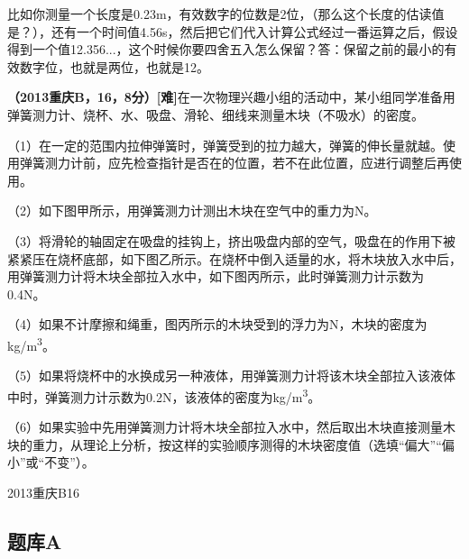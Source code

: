 \documentclass[12pt,twoside]{exam}
\begin{document}
\begin{knowledge}
比如你测量一个长度是0.23m，有效数字的位数是2位，（那么这个长度的估读值是？），还有一个时间值4.56s，然后把它们代入计算公式经过一番运算之后，假设得到一个值12.356...，这个时候你要四舍五入怎么保留？答：保留之前的最小的有效数字位，也就是两位，也就是12。

\textbf{（2013重庆B，16，8分）[难]}在一次物理兴趣小组的活动中，某小组同学准备用弹簧测力计、烧杯、水、吸盘、滑轮、细线来测量木块（不吸水）的密度。

（1）在一定的范围内拉伸弹簧时，弹簧受到的拉力越大，弹簧的伸长量就越\answerline*[大]。使用弹簧测力计前，应先检查指针是否在\answerline*[零刻度线]的位置，若不在此位置，应进行调整后再使用。

（2）如下图甲所示，用弹簧测力计测出木块在空气中的重力为\answerline*[0.6]N。

（3）将滑轮的轴固定在吸盘的挂钩上，挤出吸盘内部的空气，吸盘在\answerline*[大气压]的作用下被紧紧压在烧杯底部，如下图乙所示。在烧杯中倒入适量的水，将木块放入水中后，用弹簧测力计将木块全部拉入水中，如下图丙所示，此时弹簧测力计示数为0.4N。

（4）如果不计摩擦和绳重，图丙所示的木块受到的浮力为\answerline*[1]N，木块的密度为\answerline*[\num{0.6d3}] \si{kg/m^3}。

（5）如果将烧杯中的水换成另一种液体，用弹簧测力计将该木块全部拉入该液体中时，弹簧测力计示数为0.2N，该液体的密度为\answerline*[\num{0.8d3}] \si{kg/m^3}。

（6）如果实验中先用弹簧测力计将木块全部拉入水中，然后取出木块直接测量木块的重力，从理论上分析，按这样的实验顺序测得的木块密度值\answerline*[偏大]（选填“偏大”“偏小”或“不变”）。

\begin{linefig}[0.8]{2013重庆B16}
\end{linefig}


\end{knowledge}





\begin{Aquestions}
\newpage
\section{题库A}


\end{Aquestions}
\end{document}
